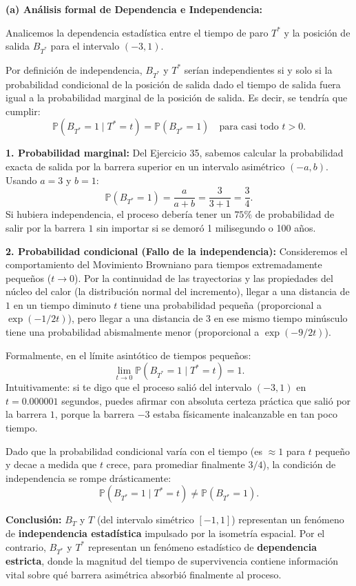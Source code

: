 \documentclass[11pt, letterpaper]{article}
\begin{document}
\begin{solucion}
    \vspace{3mm}
    \textbf{(a) Análisis formal de Dependencia e Independencia:}

    Analicemos la dependencia estadística entre el tiempo de paro $T^*$ y la posición de salida $B_{T^*}$ para el intervalo $(-3, 1)$.

    Por definición de independencia, $B_{T^*}$ y $T^*$ serían independientes si y solo si la probabilidad condicional de la posición de salida dado el tiempo de salida fuera igual a la probabilidad marginal de la posición de salida. Es decir, se tendría que cumplir:
    \[ \mathbb{P}(B_{T^*} = 1 \mid T^* = t) = \mathbb{P}(B_{T^*} = 1) \quad \text{para casi todo } t > 0. \]

    \textbf{1. Probabilidad marginal:}
    Del Ejercicio 35, sabemos calcular la probabilidad exacta de salida por la barrera superior en un intervalo asimétrico $(-a, b)$. Usando $a=3$ y $b=1$:
    \[ \mathbb{P}(B_{T^*} = 1) = \frac{a}{a+b} = \frac{3}{3+1} = \frac{3}{4}. \]
    Si hubiera independencia, el proceso debería tener un $75\%$ de probabilidad de salir por la barrera $1$ sin importar si se demoró 1 milisegundo o 100 años.

    \textbf{2. Probabilidad condicional (Fallo de la independencia):}
    Consideremos el comportamiento del Movimiento Browniano para tiempos extremadamente pequeños ($t \to 0$).
    Por la continuidad de las trayectorias y las propiedades del núcleo del calor (la distribución normal del incremento), llegar a una distancia de $1$ en un tiempo diminuto $t$ tiene una probabilidad pequeña (proporcional a $\exp(-1/2t)$), pero llegar a una distancia de $3$ en ese mismo tiempo minúsculo tiene una probabilidad abismalmente menor (proporcional a $\exp(-9/2t)$).
    
    Formalmente, en el límite asintótico de tiempos pequeños:
    \[ \lim_{t \to 0} \mathbb{P}(B_{T^*} = 1 \mid T^* = t) = 1. \]
    Intuitivamente: si te digo que el proceso salió del intervalo $(-3, 1)$ en $t = 0.000001$ segundos, puedes afirmar con absoluta certeza práctica que salió por la barrera $1$, porque la barrera $-3$ estaba físicamente inalcanzable en tan poco tiempo.

    Dado que la probabilidad condicional varía con el tiempo (es $\approx 1$ para $t$ pequeño y decae a medida que $t$ crece, para promediar finalmente $3/4$), la condición de independencia se rompe drásticamente:
    \[ \mathbb{P}(B_{T^*} = 1 \mid T^* = t) \neq \mathbb{P}(B_{T^*} = 1). \]

    \textbf{Conclusión:}
    $B_T$ y $T$ (del intervalo simétrico $[-1,1]$) representan un fenómeno de \textbf{independencia estadística} impulsado por la isometría espacial. Por el contrario, $B_{T^*}$ y $T^*$ representan un fenómeno estadístico de \textbf{dependencia estricta}, donde la magnitud del tiempo de supervivencia contiene información vital sobre qué barrera asimétrica absorbió finalmente al proceso.
\end{solucion}
\end{document}
